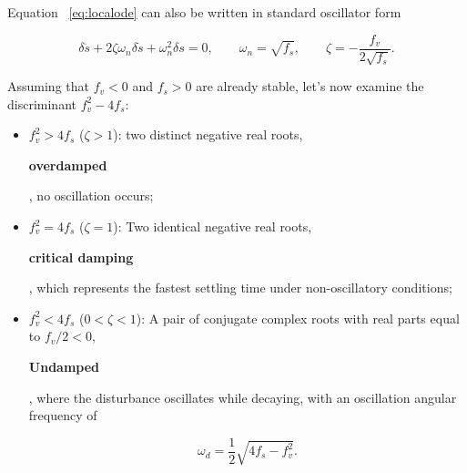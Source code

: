 \documentclass[11pt,a4paper,openany]{book}
\numberwithin{equation}{chapter}
\numberwithin{figure}{chapter}
\numberwithin{table}{chapter}
\begin{document}
Equation ~\eqref{eq:localode} can also be written in standard oscillator form

\begin{equation}
\delta\ddot s+2\zeta\omega_n\delta\dot s+\omega_n^2\delta s=0,
\qquad
\omega_n=\sqrt{f_s},
\qquad
\zeta=-\frac{f_v}{2\sqrt{f_s}}.
\end{equation}

Assuming that $f_v<0$ and $f_s>0$ are already stable, let’s now examine the discriminant $f_v^2-4f_s$:







\begin{itemize}[leftmargin=1.4em,itemsep=2pt]
  \item




 $f_v^2>4f_s$ ($\zeta>1$): two distinct negative real roots,




\textbf{overdamped}




, no oscillation occurs;







\item




 $f_v^2=4f_s$ ($\zeta=1$): Two identical negative real roots,




\textbf{critical damping}




, which represents the fastest settling time under non-oscillatory conditions;







\item




$f_v^2<4f_s$ ($0<\zeta<1$): A pair of conjugate complex roots with real parts equal to $f_v/2<0$,




\textbf{Undamped}




, where the disturbance oscillates while decaying, with an oscillation angular frequency of

  \[
  \omega_d=\frac12\sqrt{4f_s-f_v^2}.
  \]


\end{itemize}
\end{document}
